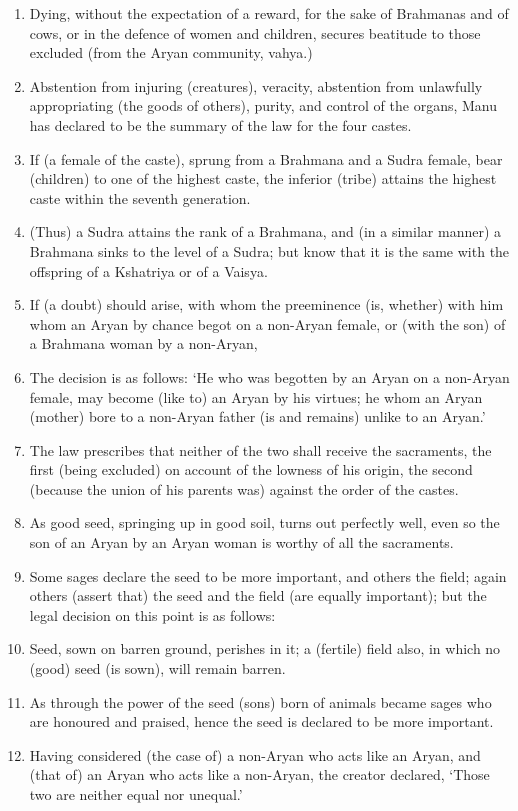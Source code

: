 \begin{enumerate}
\item Dying, without the expectation of a reward, for the sake of Brahmanas and of cows, or in the defence of women and children, secures beatitude to those excluded (from the Aryan community, vahya.)
\item Abstention from injuring (creatures), veracity, abstention from unlawfully appropriating (the goods of others), purity, and control of the organs, Manu has declared to be the summary of the law for the four castes.
\item If (a female of the caste), sprung from a Brahmana and a Sudra female, bear (children) to one of the highest caste, the inferior (tribe) attains the highest caste within the seventh generation.
\item (Thus) a Sudra attains the rank of a Brahmana, and (in a similar manner) a Brahmana sinks to the level of a Sudra; but know that it is the same with the offspring of a Kshatriya or of a Vaisya.
\item If (a doubt) should arise, with whom the preeminence (is, whether) with him whom an Aryan by chance begot on a non-Aryan female, or (with the son) of a Brahmana woman by a non-Aryan,
\item The decision is as follows: `He who was begotten by an Aryan on a non-Aryan female, may become (like to) an Aryan by his virtues; he whom an Aryan (mother) bore to a non-Aryan father (is and remains) unlike to an Aryan.'
\item The law prescribes that neither of the two shall receive the sacraments, the first (being excluded) on account of the lowness of his origin, the second (because the union of his parents was) against the order of the castes.
\item As good seed, springing up in good soil, turns out perfectly well, even so the son of an Aryan by an Aryan woman is worthy of all the sacraments.
\item Some sages declare the seed to be more important, and others the field; again others (assert that) the seed and the field (are equally important); but the legal decision on this point is as follows:
\item Seed, sown on barren ground, perishes in it; a (fertile) field also, in which no (good) seed (is sown), will remain barren.
\item As through the power of the seed (sons) born of animals became sages who are honoured and praised, hence the seed is declared to be more important.
\item Having considered (the case of) a non-Aryan who acts like an Aryan, and (that of) an Aryan who acts like a non-Aryan, the creator declared, `Those two are neither equal nor unequal.'

\end{enumerate}
